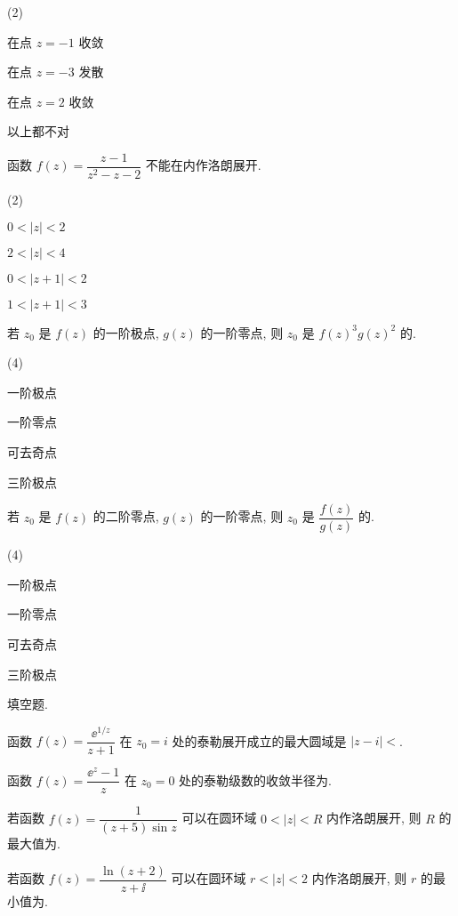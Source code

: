 \begin{homework}
\begin{homework}
      \begin{exchoice}(2)
        \item 在点 $z=-1$ 收敛
        \item 在点 $z=-3$ 发散
        \item 在点 $z=2$ 收敛
        \item 以上都不对
      \end{exchoice}
    \item 函数 $f(z)=\dfrac{z-1}{z^2-z-2}$ 不能在\fillbrace{}内作洛朗展开.
      \begin{exchoice}(2)
        \item $0<|z|<2$
        \item $2<|z|<4$
        \item $0<|z+1|<2$
        \item $1<|z+1|<3$
      \end{exchoice}
    \item 若 $z_0$ 是 $f(z)$ 的一阶极点, $g(z)$ 的一阶零点, 则 $z_0$ 是 $f(z)^3g(z)^2$ 的\fillbrace{}.
      \begin{exchoice}(4)
        \item 一阶极点
        \item 一阶零点
        \item 可去奇点
        \item 三阶极点
      \end{exchoice}
    \item 若 $z_0$ 是 $f(z)$ 的二阶零点, $g(z)$ 的一阶零点, 则 $z_0$ 是 $\dfrac{f(z)}{g(z)}$ 的\fillbrace{}.
      \begin{exchoice}(4)
        \item 一阶极点
        \item 一阶零点
        \item 可去奇点
        \item 三阶极点
      \end{exchoice}
  \end{homework}
  \item 填空题.
  \begin{homework}
    \item 函数 $f(z)=\dfrac{\ee^{1/z}}{z+1}$ 在 $z_0=i$ 处的泰勒展开成立的最大圆域是 $|z-i|<$\fillblank{}.
    \item 函数 $f(z)=\dfrac{\ee^z-1}{z}$ 在 $z_0=0$ 处的泰勒级数的收敛半径为\fillblank{}.
    \item 若函数 $f(z)=\dfrac1{(z+5)\sin z}$ 可以在圆环域 $0<|z|<R$ 内作洛朗展开, 则 $R$ 的最大值为\fillblank{}.
    \item 若函数 $f(z)=\dfrac{\ln(z+2)}{z+\ii}$ 可以在圆环域 $r<|z|<2$ 内作洛朗展开, 则 $r$ 的最小值为\fillblank{}.

\end{homework}
\end{homework}
